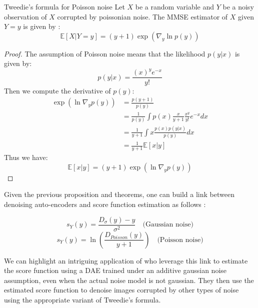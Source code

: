 \begin{theorem}{Tweedie's formula for Poisson noise}
    Let $X$ be a random variable and $Y$ be a noisy observation of $X$ corrupted by poissonian noise. The MMSE estimator of $X$ given $Y = y$ is given by :
    \begin{equation}
        \mathbb{E}\left[X | Y = y\right] = (y + 1)\exp \left( \nabla_y \ln p(y)\right)
    \end{equation}
\end{theorem}

\begin{proof}
    The assumption of Poisson noise means that the likelihood $p(y|x)$ is given by:
    \begin{equation*}
        p(y|x) = \frac{(x)^{y} e^{-x}}{y!}
    \end{equation*}
    Then we compute the derivative of $p(y)$:
    \begin{align*}
        \exp(\ln \nabla_y p(y)) &= \frac{p(y+1)}{p(y)} \\
        &= \frac{1}{p(y)} \int p(x) \frac{x}{y+1}\frac{x^y}{y!}e^{-x} dx \\
        &= \frac{1}{y+1} \int x \frac{p(x) p(y|x)}{p(y)} dx \\
        &= \frac{1}{y+1} \mathbb{E}[x|y]
    \end{align*}
    Thus we have:
    \begin{equation*}
        \mathbb{E}[x|y] = (y+1) \exp(\ln \nabla_y p(y))
    \end{equation*}
\end{proof}


Given the previous proposition and theorems, one can build a link between denoising auto-encoders and score function estimation as follows :

\begin{equation}
    s_Y(y) = \frac{D_{\sigma}(y) - y}{\sigma^2} \quad \text{(Gaussian noise)}
\end{equation}
\begin{equation}
    s_Y(y) = \ln \left( \frac{D_{Poisson}(y)}{y + 1} \right) \quad \text{(Poisson noise)}
\end{equation}

We can highlight an intriguing application of \cite{kim_noise2score_nodate} who leverage this link to estimate the score function using a DAE trained under an additive gaussian noise assumption, even when the actual noise model is not gaussian. They then use the estimated score function to denoise images corrupted by other types of noise using the appropriate variant of Tweedie's formula.


